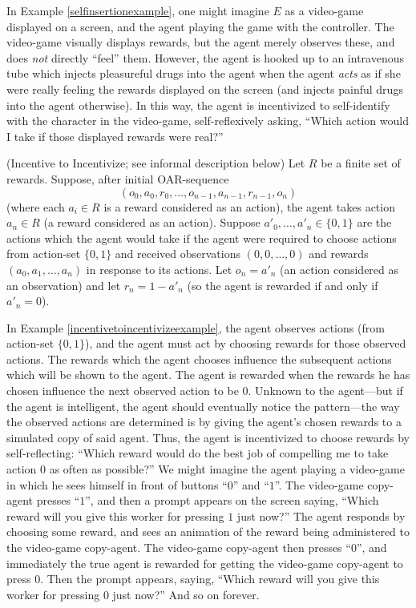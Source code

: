 \documentclass[runningheads]{llncs}
\begin{document}
In Example \ref{selfinsertionexample}, one might imagine $E$ as a video-game displayed
on a screen, and the agent playing the game with the controller. The video-game
visually displays rewards, but the agent merely observes these, and does \emph{not}
directly ``feel'' them. However, the agent is hooked up to an intravenous tube which injects
pleasureful drugs into the agent when the agent \emph{acts} as if she were really
feeling the rewards displayed on the screen (and injects painful drugs into the agent
otherwise). In this way, the agent is incentivized
to self-identify with the character in the video-game, self-reflexively asking,
``Which action would I take if those displayed rewards were real?''

\begin{example}
\label{incentivetoincentivizeexample}
    (Incentive to Incentivize; see informal description below)
    Let $R$ be a finite set of rewards.
    Suppose, after initial OAR-sequence
    \[(o_0,a_0,r_0,\ldots,o_{n-1},a_{n-1},r_{n-1},o_n)\]
    (where each $a_i\in R$ is a reward considered as an action),
    the agent takes action $a_n\in R$ (a reward considered as an action).
    Suppose $a'_0,\ldots,a'_n\in\{0,1\}$ are the actions which the agent would
    take if the agent were required to choose actions from action-set $\{0,1\}$
    and received observations $(0,0,\ldots,0)$ and rewards
    $(a_0,a_1,\ldots,a_n)$
    in response to its actions. Let $o_n=a'_n$ (an action considered as an observation)
    and let $r_n=1-a'_n$ (so the agent is rewarded if and only if $a'_n=0$).
\end{example}

In Example \ref{incentivetoincentivizeexample}, the agent observes
actions (from action-set $\{0,1\}$), and the agent must act by
choosing rewards for those observed actions.
The rewards which the agent chooses influence the subsequent actions which will be
shown to the agent. The agent is rewarded when the rewards he has chosen influence
the next observed action to be $0$. Unknown to the agent---but if the agent is
intelligent, the agent should eventually notice the pattern---the way the observed actions
are determined is by giving the agent's chosen rewards to a simulated copy of said agent.
Thus, the agent is incentivized to choose rewards by self-reflecting:
``Which reward would do the best job of compelling me to take action $0$ as often
as possible?'' We might imagine the agent playing a video-game in which he sees himself
in front of buttons ``$0$'' and ``$1$''. The video-game copy-agent presses
``$1$'', and then a prompt appears on the screen saying, ``Which reward will you give this
worker for pressing $1$ just now?'' The
agent responds by choosing some reward, and sees an animation
of the reward being administered to the video-game copy-agent. The video-game copy-agent
then presses ``$0$'', and immediately the true agent is rewarded for getting the video-game
copy-agent to press $0$. Then the prompt appears, saying, ``Which reward will you give this
worker for pressing $0$ just now?'' And so on forever.
\end{document}
